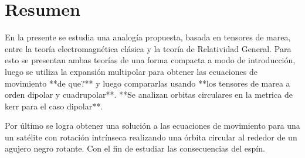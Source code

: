 \chapter*{Resumen}

En la presente se estudia una analogía propuesta, basada en tensores de marea, entre la teoría electromagnética clásica y la teoría de Relatividad General. Para esto se presentan ambas teorías de una forma compacta a modo de introducción, luego se utiliza la expansión multipolar para obtener las ecuaciones de movimiento **de que?** y luego compararlas usando **los tensores de marea a orden dipolar y cuadrupolar**. **Se analizan orbitas circulares en la metrica de kerr para el caso dipolar**.

 Por último se logra obtener una solución a las ecuaciones de movimiento para una un satélite con rotación intrínseca realizando una órbita circular al rededor de un agujero negro rotante.  Con el fin de estudiar las consecuencias del espín.